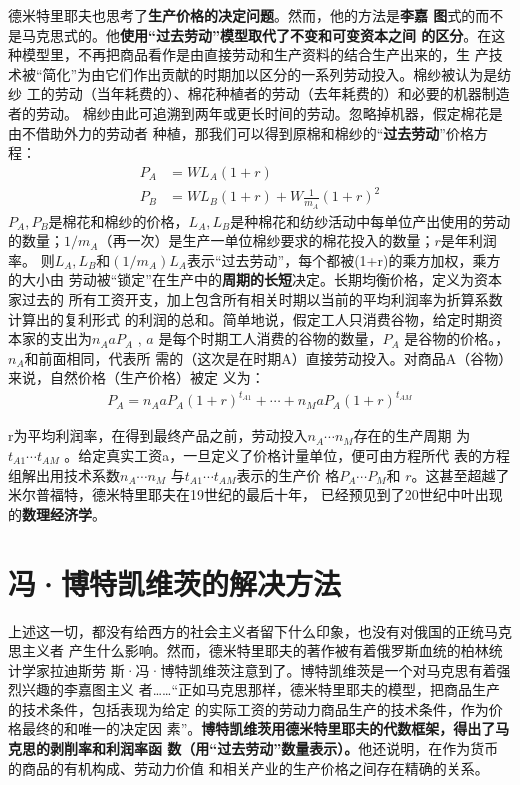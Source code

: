 德米特里耶夫也思考了\textbf{生产价格的决定问题}。然而，他的方法是\textbf{李嘉
  图}式的而不是马克思式的。他\textbf{使用“过去劳动”模型取代了不变和可变资本之间
  的区分}。在这种模型里，不再把商品看作是由直接劳动和生产资料的结合生产出来的，生
产技术被“简化”为由它们作出贡献的时期加以区分的一系列劳动投入。棉纱被认为是纺纱
工的劳动（当年耗费的）、棉花种植者的劳动（去年耗费的）和必要的机器制造者的劳动。
棉纱由此可追溯到两年或更长时间的劳动。忽略掉机器，假定棉花是由不借助外力的劳动者
种植，那我们可以得到原棉和棉纱的“\textbf{过去劳动}”价格方程：
\begin{align}
  P_A &= WL_A(1 + r) \\
  P_B &= WL_B(1 + r) + W\frac{1}{m_A}(1+r)^2
\end{align}
$P_A, P_B$是棉花和棉纱的价格，$L_A, L_B$是种棉花和纺纱活动中每单位产出使用的劳动
的数量；$1/m_A$（再一次）是生产一单位棉纱要求的棉花投入的数量；$r$是年利润率。
则$L_A,L_B$和$(1/m_A)L_A$表示“过去劳动”，每个都被(1+r)的乘方加权，乘方的大小由
劳动被“锁定”在生产中的\textbf{周期的长短}决定。长期均衡价格，定义为资本家过去的
所有工资开支，加上包含所有相关时期以当前的平均利润率为折算系数计算出的复利形式
的利润的总和。简单地说，假定工人只消费谷物，给定时期资本家的支出为$n_AaP_A$ ,
$a$ 是每个时期工人消费的谷物的数量，$P_A$ 是谷物的价格。，$n_A$和前面相同，代表所
需的（这次是在时期A）直接劳动投入。对商品A（谷物）来说，自然价格（生产价格）被定
义为：
\begin{gather}
  P_A = n_AaP_A(1+r)^{t_{A1}} + \cdots + n_MaP_A(1+r)^{t_{AM}}
\end{gather}

r为平均利润率，在得到最终产品之前，劳动投入$n_A \cdots n_M$存在的生产周期
为$t_{A1} \cdots t_{AM}$ 。给定真实工资a，一旦定义了价格计量单位，便可由方程所代
表的方程组解出用技术系数$n_A \cdots n_M$ 与$t_{A1} \cdots t_{AM}$表示的生产价
格$P_A \cdots P_M$和 $r$。这甚至超越了米尔普福特，德米特里耶夫在19世纪的最后十年，
已经预见到了20世纪中叶出现的\textbf{数理经济学}。

\section{冯·博特凯维茨的解决方法}
上述这一切，都没有给西方的社会主义者留下什么印象，也没有对俄国的正统马克思主义者
产生什么影响。然而，德米特里耶夫的著作被有着俄罗斯血统的柏林统计学家拉迪斯劳
斯·冯·博特凯维茨注意到了。博特凯维茨是一个对马克思有着强烈兴趣的李嘉图主义
者……“正如马克思那样，德米特里耶夫的模型，把商品生产的技术条件，包括表现为给定
的实际工资的劳动力商品生产的技术条件，作为价格最终的和唯一的决定因
素”。\textbf{博特凯维茨用德米特里耶夫的代数框架，得出了马克思的剥削率和利润率函
  数（用“过去劳动”数量表示）。}他还说明，在作为货币的商品的有机构成、劳动力价值
和相关产业的生产价格之间存在精确的关系。

